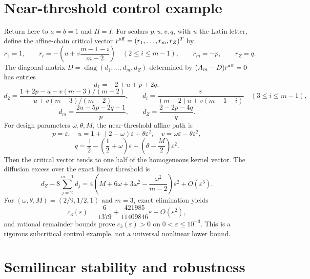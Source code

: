 \documentclass[10pt]{article}
\newcommand{\diag}{\operatorname{diag}}
\newcommand{\1}{\mathbf1}
\begin{document}
\section{Near-threshold control example}

Return here to $a=b=1$ and $H=I$.  For scalars $p,u,v,q$, with $u$ the
Latin letter, define the affine-chain critical vector
$r^{\rm aff}=(r_1,\ldots,r_m,r_Z)^T$ by
\[
 r_1=1,\qquad
 r_i=-\left(u+v\frac{m-1-i}{m-2}\right)
 \quad(2\le i\le m-1),
 \qquad r_m=-p,\qquad r_Z=q.
\]
The diagonal matrix $D=\diag(d_1,\ldots,d_m,d_Z)$ determined by
$(A_m-D)r^{\rm aff}=0$ has entries
\[
 d_1=-2+u+p+2q,
\]
\[
 d_2=
 \frac{1+2p-u-v(m-3)/(m-2)}
 {u+v(m-3)/(m-2)},
 \qquad
 d_i=\frac{v}{(m-2)u+v(m-1-i)}
 \quad(3\le i\le m-1),
\]
\[
 d_m=\frac{2u-5p-2q-1}{p},
 \qquad
 d_Z=\frac{2-2p-4q}{q}.
\]
For design parameters $\omega,\theta,M$, the near-threshold affine path is
\[
p=\varepsilon,\quad
u=1+(2-\omega)\varepsilon+\theta\varepsilon^2,\quad
v=\omega\varepsilon-\theta\varepsilon^2,
\]
\[
q=\frac12-\left(\frac12+\omega\right)\varepsilon
 +\left(\theta-\frac M2\right)\varepsilon^2.
\]
Then the critical vector tends to one half of the homogeneous kernel vector.  The
diffusion excess over the exact linear threshold is
\[
 d_Z-8\sum_{j=2}^{m-1}d_j
 =4\left(M+6\omega+3\omega^2-\frac{\omega^2}{m-2}\right)\varepsilon^2
 +O(\varepsilon^3).
\]
For $(\omega,\theta,M)=(2/9,1/2,1)$ and $m=3$, exact elimination yields
\[
 c_3(\varepsilon)=\frac6{1379}
 +\frac{421985}{11409846}\varepsilon+O(\varepsilon^2),
\]
and rational remainder bounds prove $c_3(\varepsilon)>0$ on
$0<\varepsilon\le10^{-3}$.  This is a rigorous subcritical control example,
not a universal nonlinear lower bound.

\section{Semilinear stability and robustness}
\end{document}
